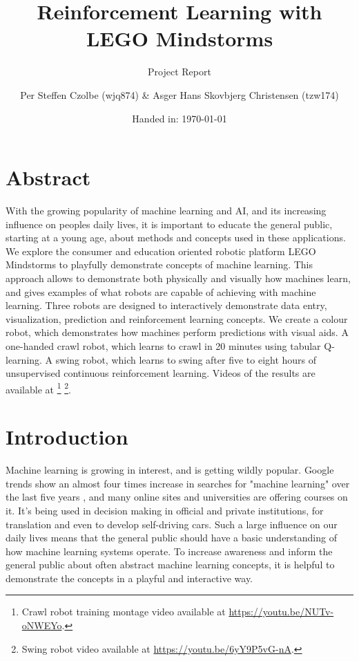 \documentclass[11pt, a4paper]{article}
\author{Per Steffen Czolbe (wjq874) \& Asger Hans Skovbjerg Christensen (tzw174)}
\title{Reinforcement Learning with LEGO Mindstorms}
\subtitle{Project Report}
\date{Handed in: \today}
\begin{document}
	\maketitle
	
	\section{Abstract}
	With the growing popularity of machine learning and AI, and its increasing influence on peoples daily lives, it is important to educate the general public, starting at a young age, about methods and concepts used in these applications. We explore the consumer and education oriented robotic platform LEGO Mindstorms to playfully demonstrate concepts of machine learning. This approach allows to demonstrate both physically and visually how machines learn, and gives examples of what robots are capable of achieving with machine learning. Three robots are designed to interactively demonstrate data entry, visualization, prediction and reinforcement learning concepts. We create a colour robot, which demonstrates how machines perform predictions with visual aids. A one-handed crawl robot, which learns to crawl in 20 minutes using tabular Q-learning. A swing robot, which learns to swing after five to eight hours of unsupervised continuous reinforcement learning. Videos of the results are available at \footnote{Crawl robot training montage video available at \url{https://youtu.be/NUTv-oNWEYo}.} \footnote{Swing robot video available at \url{https://youtu.be/6yY9P5vG-nA}.}.
	
	\tableofcontents
	
	
	\section{Introduction}
	
	
	Machine learning is growing in interest, and is getting wildly popular. Google trends show an almost four times increase in searches for "machine learning" over the last five years \cite{googletrendsML}, and many online sites and universities are offering courses on it. It's being used in decision making in official and private institutions, for translation and even to develop self-driving cars. Such a large influence on our daily lives means that the general public should have a basic understanding of how machine learning systems operate. To increase awareness and inform the general public about often abstract machine learning concepts, it is helpful to demonstrate the concepts in a playful and interactive way.
	
\end{document}
